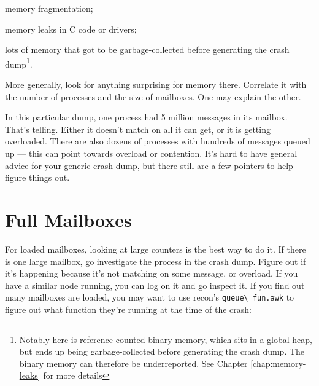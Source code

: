 \documentclass[11pt, oneside]{book}   	%
\newcommand{\app}[1]{\Verb`#1`}
\begin{document}
\begin{itemize*}
	\item memory fragmentation;
	\item memory leaks in C code or drivers;
	\item lots of memory that got to be garbage-collected before generating the crash dump\footnote{Notably here is reference-counted binary memory, which sits in a global heap, but ends up being garbage-collected before generating the crash dump. The binary memory can therefore be underreported. See Chapter \ref{chap:memory-leaks} for more details}.
\end{itemize*}

More generally, look for anything surprising for memory there. Correlate it with the number of processes and the size of mailboxes. One may explain the other. 

In this particular dump, one process had 5 million messages in its mailbox. That's telling. Either it doesn't match on all it can get, or it is getting overloaded. There are also dozens of processes with hundreds of messages queued up — this can point towards overload or contention. It's hard to have general advice for your generic crash dump, but there still are a few pointers to help figure things out.

\section{Full Mailboxes}
\label{sec:crash-full-mailboxes}

For loaded mailboxes, looking at large counters is the best way to do it. If there is one large mailbox, go investigate the process in the crash dump. Figure out if it's happening because it's not matching on some message, or overload. If you have a similar node running, you can log on it and go inspect it. If you find out many mailboxes are loaded, you may want to use recon's \app{queue\_fun.awk} to figure out what function they're running at the time of the crash:

\end{document}
